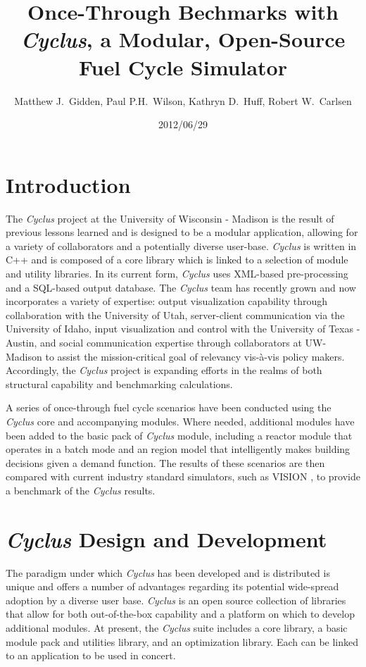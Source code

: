 \documentclass{anstrans}
\title{Once-Through Bechmarks with \emph{Cyclus}, a Modular, Open-Source Fuel Cycle Simulator}
\author{Matthew J.~Gidden, Paul P.H.~Wilson, Kathryn D.~Huff, Robert W.~Carlsen}
\institute{Department of Nuclear Engineering \& Engineering Physics, University of Wisconsin - Madison, Madison, WI, 53703}
\date{2012/06/29}
\begin{document}
\section{Introduction}
The \emph{Cyclus} project at the University of Wisconsin - Madison is the result of previous lessons learned and is designed to be a 
modular application, allowing for a variety of collaborators and a potentially diverse user-base. \emph{Cyclus} is written in C++ and
is composed of a core library which is linked to a selection of module and utility libraries. In its current form, \emph{Cyclus} uses
XML-based pre-processing and a SQL-based output database. The \emph{Cyclus} team has recently grown and now incorporates a variety of 
expertise: output visualization capability through collaboration with the University of Utah, server-client communication via the 
University of Idaho, input visualization and control with the University of Texas - Austin, and social communication expertise 
through collaborators at UW-Madison to assist the mission-critical goal of relevancy vis-\`{a}-vis policy makers. Accordingly, the 
\emph{Cyclus} project is expanding efforts in the realms of both structural capability and benchmarking calculations.

A series of once-through fuel cycle scenarios have been conducted using the \emph{Cyclus} core and accompanying modules. Where needed,
additional modules have been added to the basic pack of \emph{Cyclus} module, including a reactor module that operates in a batch 
mode and an region model that intelligently makes building decisions given a demand function. The results of these scenarios
are then compared with current industry standard simulators, such as VISION \cite{vision2009}, to provide a benchmark of the
\emph{Cyclus} results.
\section{\emph{Cyclus} Design and Development}
The paradigm under which \emph{Cyclus} has been developed and is distributed is unique and offers a number of advantages regarding its 
potential wide-spread adoption by a diverse user base. \emph{Cyclus} is an open source collection of libraries that
allow for both out-of-the-box capability and a platform on which to develop additional modules. At present, the \emph{Cyclus} suite 
includes a core library, a basic module pack and utilities library, and an optimization library. Each can be linked to an 
application to be used in concert.
\end{document}
